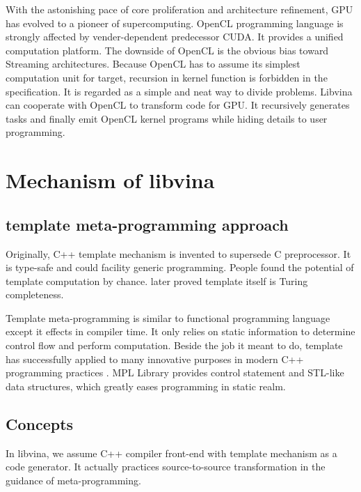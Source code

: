 \documentclass[10pt, conference, compsocconf]{IEEEtran}
\begin{document}
With the astonishing pace of core proliferation and architecture refinement, GPU has evolved to a pioneer of supercomputing. OpenCL \cite{b12} programming language is strongly affected by vender-dependent predecessor CUDA. It provides a unified computation platform. The downside of OpenCL is the obvious bias toward Streaming architectures. Because OpenCL has to assume its simplest computation unit for target, recursion in kernel function is forbidden in the specification. It is regarded as a simple and neat way to divide problems. Libvina can cooperate with OpenCL to transform code for GPU. It recursively generates tasks and finally emit OpenCL kernel programs while hiding details to user programming. 

\section{Mechanism of libvina}
\subsection{template meta-programming approach}
Originally, C++ template mechanism is invented to supersede C preprocessor. It is type-safe and could facility generic programming. People found the potential of template computation by chance. \cite{b6} later proved template itself is Turing completeness. 

Template meta-programming is similar to functional programming language except it effects in compiler time. It only relies on static information to determine control flow and perform computation. Beside the job it meant to do, template has successfully applied to many innovative purposes in modern C++ programming practices \cite{b9}. MPL Library \cite{b16} provides control statement and STL-like data structures, which greatly eases programming in static realm.

\subsection{Concepts}
In libvina, we assume C++ compiler front-end with template mechanism as a code generator. It actually practices source-to-source transformation in the guidance of meta-programming. 
\end{document}
